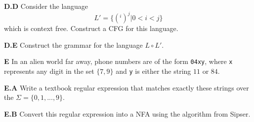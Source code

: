 \documentclass[10pt]{article}
\begin{document}
    
    

    \noindent
    \textbf{D.D} Consider the language
    \[L' = \{(^i)^j|0<i<j\}\]
    which is context free. Construct a CFG for this language.



    \noindent
    \textbf{D.E} Construct the grammar for the language $L\circ L'.$


    \newpage
    \noindent
    \textbf{E} In an alien world far away, phone numbers are of the form \texttt{04xy}, where \texttt{x} represents any digit in the set $\{7,9\}$ and \texttt{y} is either the string $11$ or $84.$

    \noindent
    \textbf{E.A}  Write a textbook regular expression that matches exactly these strings over the $\Sigma=\{0,1,...,9\}.$
    

    \noindent
    \textbf{E.B}  Convert this regular expression into a NFA using the algorithm from Sipser.

\end{document}
